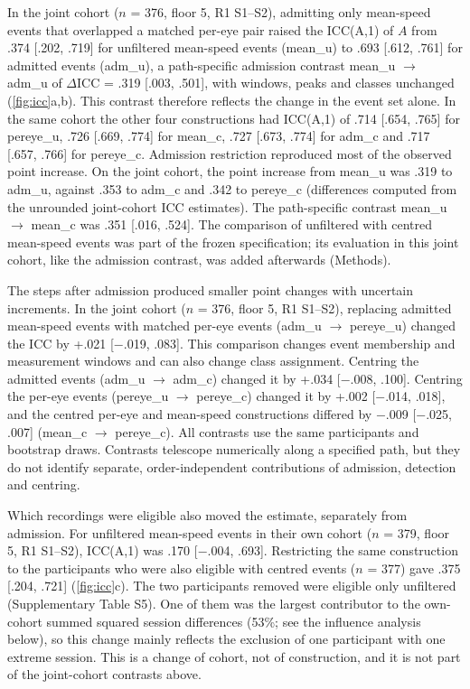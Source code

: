 In the joint cohort ($n$ = 376, floor 5, R1 S1--S2), admitting only mean-speed events that overlapped a matched per-eye pair raised the ICC(A,1) of $A$ from .374 [.202, .719] for unfiltered mean-speed events (mean\_u) to .693 [.612, .761] for admitted events (adm\_u), a path-specific admission contrast mean\_u $\to$ adm\_u of $\Delta$ICC = .319 [.003, .501], with windows, peaks and classes unchanged (\cref{fig:icc}a,b). This contrast therefore reflects the change in the event set alone. In the same cohort the other four constructions had ICC(A,1) of .714 [.654, .765] for pereye\_u, .726 [.669, .774] for mean\_c, .727 [.673, .774] for adm\_c and .717 [.657, .766] for pereye\_c. Admission restriction reproduced most of the observed point increase. On the joint cohort, the point increase from mean\_u was .319 to adm\_u, against .353 to adm\_c and .342 to pereye\_c (differences computed from the unrounded joint-cohort ICC estimates). The path-specific contrast mean\_u $\to$ mean\_c was .351 [.016, .524]. The comparison of unfiltered with centred mean-speed events was part of the frozen specification; its evaluation in this joint cohort, like the admission contrast, was added afterwards (Methods).



The steps after admission produced smaller point changes with uncertain increments. In the joint cohort ($n$ = 376, floor 5, R1 S1--S2), replacing admitted mean-speed events with matched per-eye events (adm\_u $\to$ pereye\_u) changed the ICC by +.021 [$-$.019, .083]. This comparison changes event membership and measurement windows and can also change class assignment. Centring the admitted events (adm\_u $\to$ adm\_c) changed it by +.034 [$-$.008, .100]. Centring the per-eye events (pereye\_u $\to$ pereye\_c) changed it by +.002 [$-$.014, .018], and the centred per-eye and mean-speed constructions differed by $-$.009 [$-$.025, .007] (mean\_c $\to$ pereye\_c). All contrasts use the same participants and bootstrap draws. Contrasts telescope numerically along a specified path, but they do not identify separate, order-independent contributions of admission, detection and centring.

Which recordings were eligible also moved the estimate, separately from admission. For unfiltered mean-speed events in their own cohort ($n$ = 379, floor 5, R1 S1--S2), ICC(A,1) was .170 [$-$.004, .693]. Restricting the same construction to the participants who were also eligible with centred events ($n$ = 377) gave .375 [.204, .721] (\cref{fig:icc}c). The two participants removed were eligible only unfiltered (Supplementary Table S5). One of them was the largest contributor to the own-cohort summed squared session differences (53\%; see the influence analysis below), so this change mainly reflects the exclusion of one participant with one extreme session. This is a change of cohort, not of construction, and it is not part of the joint-cohort contrasts above.

